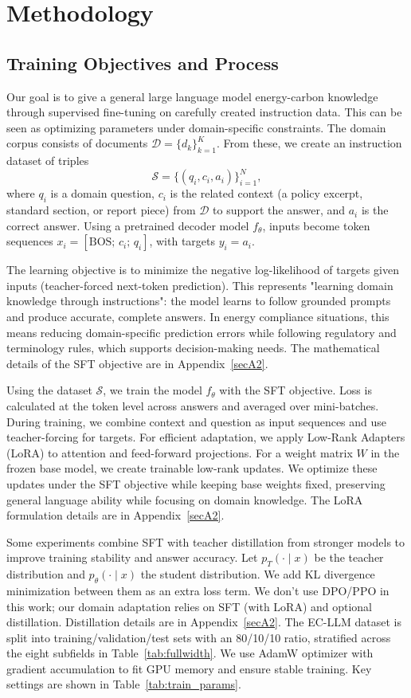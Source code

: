 \documentclass[]{interact}
\theoremstyle{plain}%
\theoremstyle{definition}
\theoremstyle{remark}
\begin{document}
\section{Methodology}\label{sec3}

\subsection{Training Objectives and Process}
Our goal is to give a general large language model energy-carbon knowledge through supervised fine-tuning on carefully created instruction data. This can be seen as optimizing parameters under domain-specific constraints. The domain corpus consists of documents \(\mathcal{D} = \{ d_k \}_{k=1}^K\). From these, we create an instruction dataset of triples
\[\mathcal{S} = \{ (q_i, c_i, a_i) \}_{i=1}^N,\]
where \(q_i\) is a domain question, \(c_i\) is the related context (a policy excerpt, standard section, or report piece) from \(\mathcal{D}\) to support the answer, and \(a_i\) is the correct answer. Using a pretrained decoder model \(f_\theta\), inputs become token sequences \(x_i = [\mathrm{BOS};\, c_i;\, q_i]\), with targets \(y_i = a_i\).

The learning objective is to minimize the negative log-likelihood of targets given inputs (teacher-forced next-token prediction). This represents "learning domain knowledge through instructions": the model learns to follow grounded prompts and produce accurate, complete answers. In energy compliance situations, this means reducing domain-specific prediction errors while following regulatory and terminology rules, which supports decision-making needs. The mathematical details of the SFT objective are in Appendix~\ref{secA2}.

Using the dataset \(\mathcal{S}\), we train the model \(f_\theta\) with the SFT objective. Loss is calculated at the token level across answers and averaged over mini-batches. During training, we combine context and question as input sequences and use teacher-forcing for targets. For efficient adaptation, we apply Low-Rank Adapters (LoRA) to attention and feed-forward projections. For a weight matrix \(W\) in the frozen base model, we create trainable low-rank updates. We optimize these updates under the SFT objective while keeping base weights fixed, preserving general language ability while focusing on domain knowledge. The LoRA formulation details are in Appendix~\ref{secA2}.

Some experiments combine SFT with teacher distillation from stronger models to improve training stability and answer accuracy. Let \(p_T(\cdot\mid x)\) be the teacher distribution and \(p_{\theta}(\cdot\mid x)\) the student distribution. We add KL divergence minimization between them as an extra loss term. We don't use DPO/PPO in this work; our domain adaptation relies on SFT (with LoRA) and optional distillation. Distillation details are in Appendix~\ref{secA2}. The EC-LLM dataset is split into training/validation/test sets with an 80/10/10 ratio, stratified across the eight subfields in Table~\ref{tab:fullwidth}. We use AdamW optimizer with gradient accumulation to fit GPU memory and ensure stable training. Key settings are shown in Table~\ref{tab:train_params}.
\end{document}

